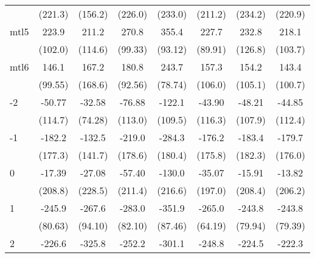 \documentclass{article}
\begin{document}
{\begin{longtable}{l*{7}{c}}
                &  (221.3)         &  (156.2)         &  (226.0)         &  (233.0)         &  (211.2)         &  (234.2)         &  (220.9)         \\
mtl5            &    223.9\sym{*}  &    211.2         &    270.8\sym{*}  &    355.4\sym{**} &    227.7\sym{*}  &    232.8         &    218.1         \\
                &  (102.0)         &  (114.6)         &  (99.33)         &  (93.12)         &  (89.91)         &  (126.8)         &  (103.7)         \\
mtl6            &    146.1         &    167.2         &    180.8         &    243.7\sym{**} &    157.3         &    154.2         &    143.4         \\
                &  (99.55)         &  (168.6)         &  (92.56)         &  (78.74)         &  (106.0)         &  (105.1)         &  (100.7)         \\
-2              &   -50.77         &   -32.58         &   -76.88         &   -122.1         &   -43.90         &   -48.21         &   -44.85         \\
                &  (114.7)         &  (74.28)         &  (113.0)         &  (109.5)         &  (116.3)         &  (107.9)         &  (112.4)         \\
-1              &   -182.2         &   -132.5         &   -219.0         &   -284.3         &   -176.2         &   -183.4         &   -179.7         \\
                &  (177.3)         &  (141.7)         &  (178.6)         &  (180.4)         &  (175.8)         &  (182.3)         &  (176.0)         \\
0               &   -17.39         &   -27.08         &   -57.40         &   -130.0         &   -35.07         &   -15.91         &   -13.82         \\
                &  (208.8)         &  (228.5)         &  (211.4)         &  (216.6)         &  (197.0)         &  (208.4)         &  (206.2)         \\
1               &   -245.9\sym{**} &   -267.6\sym{*}  &   -283.0\sym{**} &   -351.9\sym{**} &   -265.0\sym{**} &   -243.8\sym{**} &   -243.8\sym{**} \\
                &  (80.63)         &  (94.10)         &  (82.10)         &  (87.46)         &  (64.19)         &  (79.94)         &  (79.39)         \\
2               &   -226.6\sym{**} &   -325.8\sym{*}  &   -252.2\sym{***}&   -301.1\sym{***}&   -248.8\sym{***}&   -224.5\sym{**} &   -222.3\sym{**} \\

\end{longtable}}
\end{document}
